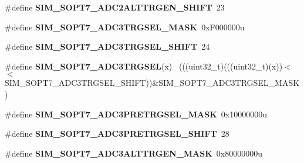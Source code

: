\begin{DoxyCompactItemize}
\item 
\hypertarget{group___s_i_m___register___masks_ga72df0c162a89d5ce86d62b4118951b02}{}\#define {\bfseries S\+I\+M\+\_\+\+S\+O\+P\+T7\+\_\+\+A\+D\+C2\+A\+L\+T\+T\+R\+G\+E\+N\+\_\+\+S\+H\+I\+F\+T}~23\label{group___s_i_m___register___masks_ga72df0c162a89d5ce86d62b4118951b02}

\item 
\hypertarget{group___s_i_m___register___masks_ga95ff763df201fa80163451fdc296742e}{}\#define {\bfseries S\+I\+M\+\_\+\+S\+O\+P\+T7\+\_\+\+A\+D\+C3\+T\+R\+G\+S\+E\+L\+\_\+\+M\+A\+S\+K}~0x\+F000000u\label{group___s_i_m___register___masks_ga95ff763df201fa80163451fdc296742e}

\item 
\hypertarget{group___s_i_m___register___masks_gab427b8056636f2addb9bc5a747d0d84c}{}\#define {\bfseries S\+I\+M\+\_\+\+S\+O\+P\+T7\+\_\+\+A\+D\+C3\+T\+R\+G\+S\+E\+L\+\_\+\+S\+H\+I\+F\+T}~24\label{group___s_i_m___register___masks_gab427b8056636f2addb9bc5a747d0d84c}

\item 
\hypertarget{group___s_i_m___register___masks_ga2dca8dc485607e59195db977feaceae5}{}\#define {\bfseries S\+I\+M\+\_\+\+S\+O\+P\+T7\+\_\+\+A\+D\+C3\+T\+R\+G\+S\+E\+L}(x)                                ~(((uint32\+\_\+t)(((uint32\+\_\+t)(x))$<$$<$S\+I\+M\+\_\+\+S\+O\+P\+T7\+\_\+\+A\+D\+C3\+T\+R\+G\+S\+E\+L\+\_\+\+S\+H\+I\+F\+T))\&S\+I\+M\+\_\+\+S\+O\+P\+T7\+\_\+\+A\+D\+C3\+T\+R\+G\+S\+E\+L\+\_\+\+M\+A\+S\+K)\label{group___s_i_m___register___masks_ga2dca8dc485607e59195db977feaceae5}

\item 
\hypertarget{group___s_i_m___register___masks_ga16dfc71912d68d4344e8b9014d1a25aa}{}\#define {\bfseries S\+I\+M\+\_\+\+S\+O\+P\+T7\+\_\+\+A\+D\+C3\+P\+R\+E\+T\+R\+G\+S\+E\+L\+\_\+\+M\+A\+S\+K}~0x10000000u\label{group___s_i_m___register___masks_ga16dfc71912d68d4344e8b9014d1a25aa}

\item 
\hypertarget{group___s_i_m___register___masks_ga08a137aa322f03b4e93314f083acae22}{}\#define {\bfseries S\+I\+M\+\_\+\+S\+O\+P\+T7\+\_\+\+A\+D\+C3\+P\+R\+E\+T\+R\+G\+S\+E\+L\+\_\+\+S\+H\+I\+F\+T}~28\label{group___s_i_m___register___masks_ga08a137aa322f03b4e93314f083acae22}

\item 
\hypertarget{group___s_i_m___register___masks_gab4e684fa214ae1fc17a98f00fe26747c}{}\#define {\bfseries S\+I\+M\+\_\+\+S\+O\+P\+T7\+\_\+\+A\+D\+C3\+A\+L\+T\+T\+R\+G\+E\+N\+\_\+\+M\+A\+S\+K}~0x80000000u\label{group___s_i_m___register___masks_gab4e684fa214ae1fc17a98f00fe26747c}


\end{DoxyCompactItemize}
